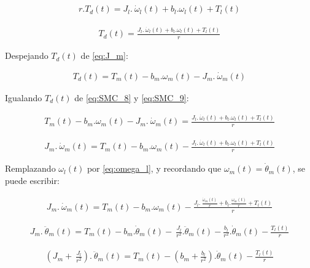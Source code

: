 \documentclass{article}
\begin{document}
\begin{sloppypar}
\begin{align} \label{eq:SMC_8-}
    r.T_d(t)=J_l.\ {\dot{\omega}}_l\left(t\right)+b_l.\omega_l(t)+T_l(t)
\end{align}

\begin{align} \label{eq:SMC_8}
    T_d(t)=\frac{J_l.\ {\dot{\omega}}_l\left(t\right)+b_l.\omega_l(t)+T_l(t)}{r}
\end{align}

Despejando $T_d(t)$ de \ref{eq:J_m}:

\begin{align} \label{eq:SMC_9}
    T_d(t)=T_m\left(t\right)-b_m.\omega_m(t)-J_m.\ {\dot{\omega}}_m\left(t\right)
\end{align}

Igualando $T_d(t)$ de \ref{eq:SMC_8} y \ref{eq:SMC_9}:

\begin{align} \label{eq:SMC_10-}
    T_m\left(t\right)-b_m.\omega_m(t)-J_m.\ {\dot{\omega}}_m\left(t\right)=\frac{J_l.\ {\dot{\omega}}_l\left(t\right)+b_l.\omega_l(t)+T_l(t)}{r}
\end{align}

\begin{align} \label{eq:SMC_10}
    J_m.\ {\dot{\omega}}_m\left(t\right)=T_m\left(t\right)-b_m.\omega_m(t)-\frac{J_l.\ {\dot{\omega}}_l\left(t\right)+b_l.\omega_l(t)+T_l(t)}{r}
\end{align}

Remplazando $\omega_l(t)$ por \ref{eq:omega_l}, y recordando que $\omega_m(t)={\dot{\theta}}_m(t)$, se puede escribir:

\begin{align} \label{eq:SMC_11-}
    J_m.\ {\dot{\omega}}_m\left(t\right)=T_m\left(t\right)-b_m.\omega_m(t)-\frac{J_l.\ \frac{{\dot{\omega}}_m\left(t\right)}{r}+b_l.\frac{\omega_m(t)}{r}+T_l(t)}{r}
\end{align}

\begin{align} \label{eq:SMC_11--}
    J_m.\ \ddot{\theta}_m\left(t\right)=T_m\left(t\right)-b_m.\dot{\theta}_m(t)-\ \frac{J_l}{r^2}.\ddot{\theta}_m\left(t\right)-\frac{b_l}{r^2}.\dot{\theta}_m(t)-\frac{T_l(t)}{r}
\end{align}

\begin{align} \label{eq:SMC_11}
    \left(J_m+\ \frac{J_l}{r^2}\right).\ {\ddot{\theta}}_m\left(t\right)=T_m\left(t\right)-\left(b_m+\frac{b_l}{r^2}\right).\dot{\theta}_m(t)-\frac{T_l(t)}{r}
\end{align}


\end{sloppypar}
\end{document}
